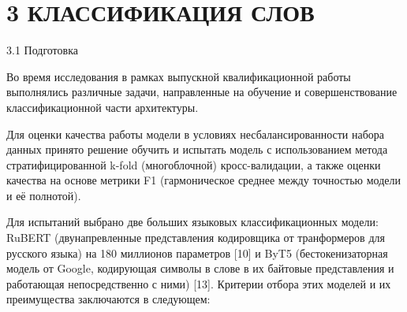 \section{3 КЛАССИФИКАЦИЯ СЛОВ}\label{ux43aux43bux430ux441ux441ux438ux444ux438ux43aux430ux446ux438ux44f-ux441ux43bux43eux432}

3.1 Подготовка

Во время исследования в рамках выпускной квалификационной работы выполнялись различные задачи, направленные на обучение и совершенствование классификационной части архитектуры.

Для оценки качества работы модели в условиях несбалансированности набора данных принято решение обучить и испытать модель с использованием метода стратифицированной k-fold (многоблочной) кросс-валидации, а также оценки качества на основе метрики F1 (гармоническое среднее между точностью модели и её полнотой).

Для испытаний выбрано две больших языковых классификационных модели: RuBERT (двунапревленные представления кодировщика от транформеров для русского языка) на 180 миллионов параметров {[}10{]} и ByT5 (бестокенизаторная модель от Google, кодирующая символы в слове в их байтовые представления и работающая непосредственно с ними) {[}13{]}. Критерии отбора этих моделей и их преимущества заключаются в следующем:

